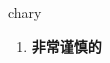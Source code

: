 
\begin{frame}
{\huge chary}
\begin{center}
\begin{enumerate}\Large
  \item \textbf{非常谨慎的}
\end{enumerate}
\end{center}
\end{frame}
